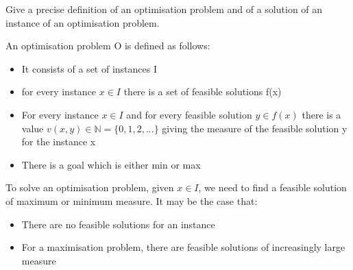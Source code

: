 \documentclass{exam}
\begin{document}
\begin{questions}
\question[5]Give a precise definition of an optimisation problem and of a solution
of an instance of an optimisation problem.
\begin{solution}[2in]
	An optimisation problem O is defined as follows:
	\begin{itemize}
		\item It consists of a set of instances I
		\item for every instance $x\in I$ there is a set of feasible solutions f(x)
		\item For every instance $x\in I$ and for every feasible solution $y\in f(x)$ there is a value $v(x,y)\in \mathbb{N}=\{0,1,2,...\}$ giving the measure of the feasible solution y for the instance x
		\item There is a goal which is either min or max
	\end{itemize}
	To solve an optimisation problem, given $x\in I$, we need to find a feasible solution of maximum or minimum measure. It may be the case that:
	\begin{itemize}
		\item There are no feasible solutions for an instance
		\item For a maximisation problem, there are feasible solutions of increasingly large measure
	\end{itemize}
\end{solution}


\end{questions}
\end{document}

